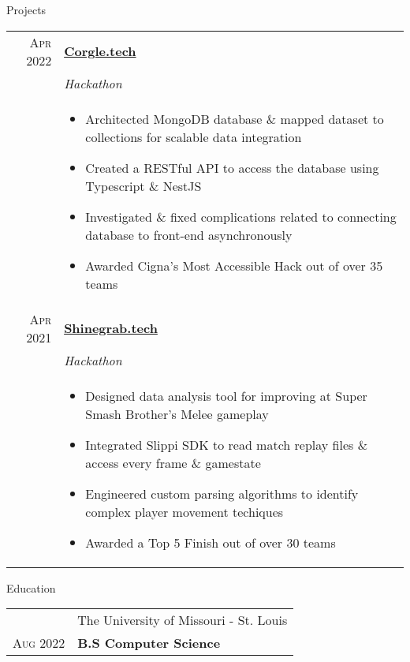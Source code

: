 \documentclass{resume}
\begin{document}
\begin{rSection}{Projects}
\small
{

	\begin{tabular}{r|p{15cm}}
		\textsc{Apr 2022} & \href{https://github.com/Sksosuh/Corgle} {\textbf{Corgle.tech}} \\ &
		 \textit{Hackathon} \\ &
		\begin{itemize}
			\item {Architected MongoDB database \& mapped dataset to collections for scalable data integration}
			\item {Created a RESTful API to access the database using Typescript \& NestJS}
			\item {Investigated \& fixed complications related to connecting database to front-end asynchronously}
			\item {Awarded Cigna's Most Accessible Hack out of over 35 teams}
		\end{itemize} \\ 
		\textsc{Apr 2021} & \href{https://github.com/mitchhit234/ShineGrabDotTech}{\textbf{Shinegrab.tech}} \\ &
		\textit{Hackathon} \\ &
		\begin{itemize}
			\item {Designed data analysis tool for improving at Super Smash Brother's Melee gameplay}
			\item {Integrated Slippi SDK to read match replay files \& access every frame \& gamestate}
			\item {Engineered custom parsing algorithms to identify complex player movement techiques}
			\item {Awarded a Top 5 Finish out of over 30 teams}
		\end{itemize}  \\
	\end{tabular}
}
\end{rSection}


 \begin{rSection}{Education}
    \small
    {
        \begin{tabular}{r|p{15cm}}
           & The University of Missouri - St. Louis\\ 
            \textsc{Aug 2022} & \textbf{B.S Computer Science } \\
        \end{tabular}
    }
\end{rSection}
\end{document}
